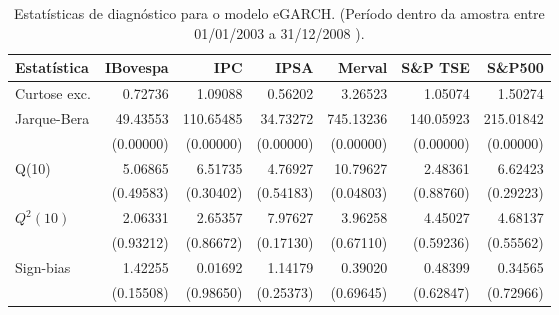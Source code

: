 \begin{table}[H]
\centering
\caption{Estatísticas de diagnóstico para o modelo eGARCH. 
               (Período dentro da amostra entre 01/01/2003 a 31/12/2008 ).} 
\label{tab:garchstats}
\begin{tabular}{lrrrrrr}
  \hline
Estatística & IBovespa & IPC & IPSA & Merval & S\&P TSE & S\&P500 \\ 
  \hline
Curtose exc. & 0.72736 & 1.09088 & 0.56202 & 3.26523 & 1.05074 & 1.50274 \\ 
  Jarque-Bera & 49.43553 & 110.65485 & 34.73272 & 745.13236 & 140.05923 & 215.01842 \\ 
   & (0.00000) & (0.00000) & (0.00000) & (0.00000) & (0.00000) & (0.00000) \\ 
  Q(10) & 5.06865 & 6.51735 & 4.76927 & 10.79627 & 2.48361 & 6.62423 \\ 
   & (0.49583) & (0.30402) & (0.54183) & (0.04803) & (0.88760) & (0.29223) \\ 
  $Q^2(10)$ & 2.06331 & 2.65357 & 7.97627 & 3.96258 & 4.45027 & 4.68137 \\ 
   & (0.93212) & (0.86672) & (0.17130) & (0.67110) & (0.59236) & (0.55562) \\ 
  Sign-bias & 1.42255 & 0.01692 & 1.14179 & 0.39020 & 0.48399 & 0.34565 \\ 
   & (0.15508) & (0.98650) & (0.25373) & (0.69645) & (0.62847) & (0.72966) \\ 
   \hline
\end{tabular}
\end{table}
